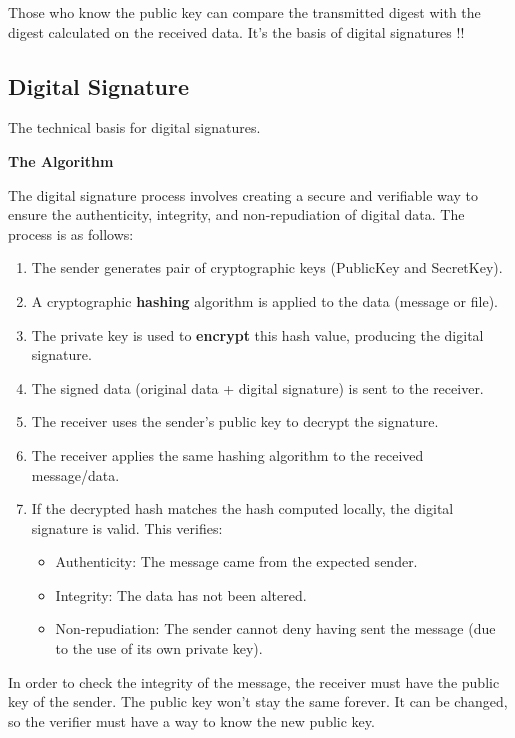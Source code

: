 Those who know the public key can compare the transmitted digest with the digest calculated on the received data. It's the basis of digital signatures !! 

\subsection{Digital Signature}
\begin{center}
    The technical basis for digital signatures.
\end{center}
\begin{center}
    \textbf{The Algorithm}
\end{center}
The digital signature process involves creating a secure and verifiable way to ensure the authenticity, integrity, and non-repudiation of digital data. The process is as follows:
\begin{enumerate}
    \item The sender generates pair of cryptographic keys (PublicKey and SecretKey).
    \item A cryptographic \textbf{hashing} algorithm is applied to the data (message or file).
    \item The private key is used to \textbf{encrypt} this hash value, producing the digital signature.
    \item The signed data (original data + digital signature) is sent to the receiver.
    \item The receiver uses the sender’s public key to decrypt the signature.
    \item The receiver applies the same hashing algorithm to the received message/data.
    \item If the decrypted hash matches the hash computed locally, the digital signature is valid. This verifies:
    \begin{itemize}
        \item Authenticity: The message came from the expected sender.
        \item Integrity: The data has not been altered.
        \item Non-repudiation: The sender cannot deny having sent the message (due to the use of its own private key).
    \end{itemize}
\end{enumerate}
\begin{tcolorbox}[colback=red!10!white, colframe=red!70!black, coltitle=white, title=Beware]
In order to check the integrity of the message, the receiver must have the public key of the sender. The public key won't stay the same forever. It can be changed, so the verifier must have a way to know the new public key.
\end{tcolorbox}

